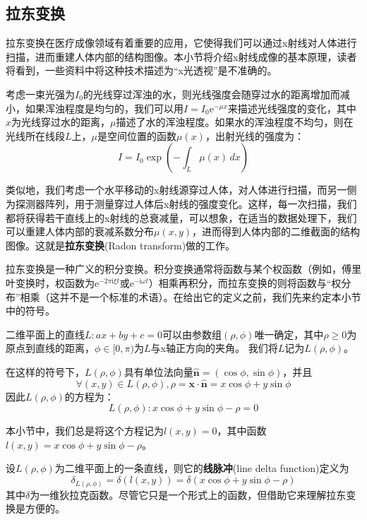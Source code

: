 \documentclass{ctexbook}
\begin{document}
\subsection{拉东变换}\label{sub:radon}

拉东变换在医疗成像领域有着重要的应用，它使得我们可以通过x射线对人体进行扫描，进而重建人体内部的结构图像。本小节将介绍x射线成像的基本原理，读者将看到，一些资料中将这种技术描述为“x光透视”是不准确的。

考虑一束光强为$I_0$的光线穿过浑浊的水，则光线强度会随穿过水的距离增加而减小，如果浑浊程度是均匀的，我们可以用$I=I_0 \mathrm{e}^{-\mu x}$来描述光线强度的变化，其中$x$为光线穿过水的距离，$\mu$描述了水的浑浊程度。如果水的浑浊程度不均匀，则在光线所在线段$L$上，$\mu$是空间位置的函数$\mu(x)$，出射光线的强度为：
\[I=I_0 \exp\left(-\int_{L}\mu(x)\,dx\right)\]

类似地，我们考虑一个水平移动的x射线源穿过人体，对人体进行扫描，而另一侧为探测器阵列，用于测量穿过人体后x射线的强度变化。这样，每一次扫描，我们都将获得若干直线上的x射线的总衰减量，可以想象，在适当的数据处理下，我们可以重建人体内部的衰减系数分布$\mu(x,y)$，进而得到人体内部的二维截面的结构图像。这就是\textbf{拉东变换}(Radon transform)做的工作。

拉东变换是一种广义的积分变换。积分变换通常将函数与某个权函数（例如，傅里叶变换时，权函数为$\mathrm{e}^{-2\pi \mathrm{i}\xi t}$或$\mathrm{e}^{-\mathrm{i}\omega t}$）相乘再积分，而拉东变换的则将函数与“权分布”相乘（这并不是一个标准的术语）。在给出它的定义之前，我们先来约定本小节中的符号。

\begin{definition}[二位平面上的直线系]
    二维平面上的直线$L:ax+by+c=0$可以由参数组$(\rho,\phi)$唯一确定，其中$\rho\geq 0$为原点到直线的距离，$\phi\in[0,\pi)$为$L$与x轴正方向的夹角。
    我们将$L$记为$L(\rho,\phi)$。
\end{definition}

在这样的符号下，$L(\rho,\phi)$具有单位法向量$\hat{\mathbf{n}}=(\cos\phi,\sin\phi)$，并且$$\forall (x,y)\in L(\rho,\phi),\rho=\mathbf{x}\cdot\hat{\mathbf{n}}=x\cos\phi+y\sin\phi$$
因此$L(\rho,\phi)$的方程为：
\[L(\rho,\phi): x\cos\phi+y\sin\phi-\rho=0\]

本小节中，我们总是将这个方程记为$l(x,y)=0$，其中函数$l(x,y)=x\cos\phi+y\sin\phi-\rho$。

\begin{definition}[线脉冲]
    设$L(\rho,\phi)$为二维平面上的一条直线，则它的\textbf{线脉冲}(line delta function)定义为
    \[\delta_{L(\rho,\phi)}=\delta(l(x,y))=\delta(x\cos\phi+y\sin\phi-\rho)\]
    其中$\delta$为一维狄拉克函数。尽管它只是一个形式上的函数，但借助它来理解拉东变换是方便的。
\end{definition}
\end{document}
